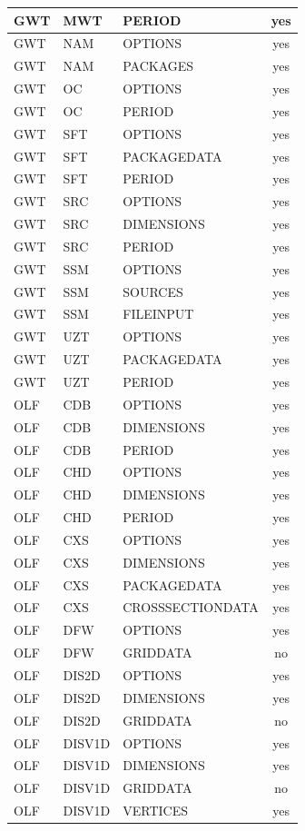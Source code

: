 \begin{longtable}{p{1.5cm} p{1.5cm} p{3cm} c}
GWT & MWT & PERIOD & yes \\ 
\hline
GWT & NAM & OPTIONS & yes \\ 
GWT & NAM & PACKAGES & yes \\ 
\hline
GWT & OC & OPTIONS & yes \\ 
GWT & OC & PERIOD & yes \\ 
\hline
GWT & SFT & OPTIONS & yes \\ 
GWT & SFT & PACKAGEDATA & yes \\ 
GWT & SFT & PERIOD & yes \\ 
\hline
GWT & SRC & OPTIONS & yes \\ 
GWT & SRC & DIMENSIONS & yes \\ 
GWT & SRC & PERIOD & yes \\ 
\hline
GWT & SSM & OPTIONS & yes \\ 
GWT & SSM & SOURCES & yes \\ 
GWT & SSM & FILEINPUT & yes \\ 
\hline
GWT & UZT & OPTIONS & yes \\ 
GWT & UZT & PACKAGEDATA & yes \\ 
GWT & UZT & PERIOD & yes \\ 
\hline
OLF & CDB & OPTIONS & yes \\ 
OLF & CDB & DIMENSIONS & yes \\ 
OLF & CDB & PERIOD & yes \\ 
\hline
OLF & CHD & OPTIONS & yes \\ 
OLF & CHD & DIMENSIONS & yes \\ 
OLF & CHD & PERIOD & yes \\ 
\hline
OLF & CXS & OPTIONS & yes \\ 
OLF & CXS & DIMENSIONS & yes \\ 
OLF & CXS & PACKAGEDATA & yes \\ 
OLF & CXS & CROSSSECTIONDATA & yes \\ 
\hline
OLF & DFW & OPTIONS & yes \\ 
OLF & DFW & GRIDDATA & no \\ 
\hline
OLF & DIS2D & OPTIONS & yes \\ 
OLF & DIS2D & DIMENSIONS & yes \\ 
OLF & DIS2D & GRIDDATA & no \\ 
\hline
OLF & DISV1D & OPTIONS & yes \\ 
OLF & DISV1D & DIMENSIONS & yes \\ 
OLF & DISV1D & GRIDDATA & no \\ 
OLF & DISV1D & VERTICES & yes \\ 

\end{longtable}
